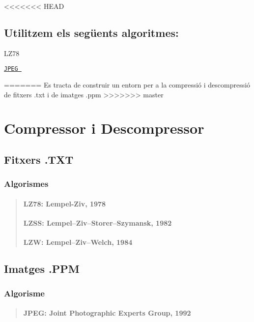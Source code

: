 <<<<<<< HEAD
\subsection*{Utilitzem els següents algoritmes\+:}


\begin{DoxyEnumerate}
\item L\+Z78
\item \href{./classdomini_1_1algorithm_1_1JPEG.html}{\tt J\+P\+EG }
\end{DoxyEnumerate}
=======
Es tracta de construir un entorn per a la compressió i descompressió de fitxers .txt i de imatges .ppm
>>>>>>> master

\section*{Compressor i Descompressor}

\subsection*{Fitxers .T\+XT}

\subsubsection*{Algorismes}

\begin{quote}
\paragraph*{L\+Z78\+: Lempel-\/\+Ziv, 1978}

\paragraph*{L\+Z\+SS\+: Lempel–\+Ziv–\+Storer–\+Szymansk, 1982}

\paragraph*{L\+ZW\+: Lempel–\+Ziv–\+Welch, 1984}

\end{quote}
\subsection*{Imatges .P\+PM}

\subsubsection*{Algorisme}

\begin{quote}
\paragraph*{J\+P\+EG\+: Joint Photographic Experts Group, 1992}

\end{quote}
